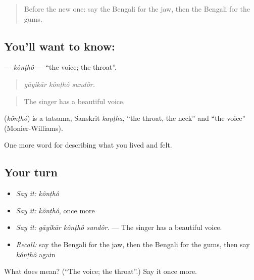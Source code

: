 \begin{quote}
Before the new one: say the Bengali for the jaw, then the Bengali for the gums.
\end{quote}

\subsection*{You'll want to know: }
\textbf{} — \emph{kônṭhô} — \textquotedblleft{}the voice; the throat\textquotedblright{}.

\begin{quote}
  
\end{quote}

\begin{quote}
\emph{gāyikār kônṭhô sundôr.}
\end{quote}

\begin{quote}
The singer has a beautiful voice.
\end{quote}

\begin{cousinweb}
\textbf{} (\emph{kônṭhô}) is a tatsama, Sanskrit \emph{kaṇṭha}, \textquotedblleft{}the throat, the neck\textquotedblright{} and \textquotedblleft{}the voice\textquotedblright{} (Monier-Williams).
\end{cousinweb}

\begin{grammarlens}[title={What you've built}]
One more word for describing what you lived and felt.
\end{grammarlens}

\subsection*{Your turn}
\begin{itemize}
\raggedright
  \item \emph{Say it:} \emph{kônṭhô}
  \item \emph{Say it:} \emph{kônṭhô}, once more
  \item \emph{Say it:} \emph{gāyikār kônṭhô sundôr.} — The singer has a beautiful voice.
  \item \emph{Recall:} say the Bengali for the jaw, then the Bengali for the gums, then say \emph{kônṭhô} again
\end{itemize}

\begin{tcolorbox}[breakable,colback=teal!4,colframe=teal!35!black,title={Before you move on}]
What does  mean? (\textquotedblleft{}The voice; the throat\textquotedblright{}.) Say it once more.
\end{tcolorbox}
